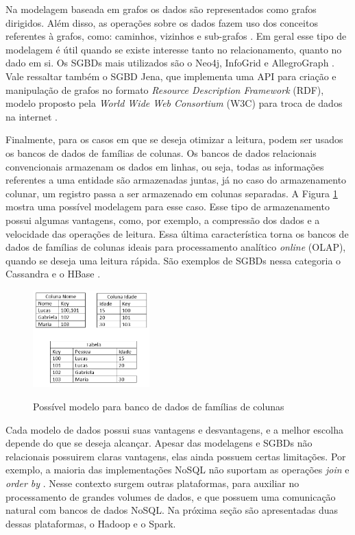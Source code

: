 Na modelagem baseada em grafos os dados são representados como grafos dirigidos. Além disso, 
as operações sobre os dados fazem uso dos conceitos referentes à grafos, como: caminhos, 
vizinhos e sub-grafos \cite{de2010nosql}. Em geral esse tipo de modelagem é útil 
quando se existe interesse tanto no relacionamento, quanto no dado em si. Os SGBDs mais 
utilizados são o Neo4j, InfoGrid e AllegroGraph \cite{moniruzzaman2013nosql}. Vale ressaltar 
também o SGBD Jena, que implementa uma API para criação e manipulação de grafos no formato 
\textit{Resource Description Framework} (RDF), modelo proposto pela \textit{World Wide Web 
Consortium} (W3C) para troca de dados na internet \cite{mcbride2001jena}.

Finalmente, para os casos em que se deseja otimizar a leitura, podem ser usados os bancos de 
dados de famílias de colunas. Os bancos de dados relacionais convencionais armazenam os dados 
em linhas, ou seja, todas as informações referentes a uma entidade são armazenadas juntas, 
já no caso do armazenamento colunar, um registro passa a ser armazenado em colunas separadas. 
A Figura \ref{fig:db-colunar} mostra uma possível modelagem para esse caso. Esse tipo de 
armazenamento possui algumas vantagens, como, por exemplo, a compressão dos dados e a 
velocidade das operações de leitura. Essa última característica torna os bancos de dados de 
famílias de colunas ideais para processamento analítico \textit{online} (OLAP), quando se 
deseja uma leitura rápida. São exemplos de SGBDs nessa categoria o Cassandra e o 
HBase \cite{de2010nosql}.

\begin{figure}[!htb]
    \centering
    \caption{Possível modelo para banco de dados de famílias de colunas}
    \includegraphics[width=0.4\textwidth]{./04-figuras/db-colunar}
    \label{fig:db-colunar}
\end{figure}


Cada modelo de dados possui suas vantagens e desvantagens, e a melhor escolha depende do que 
se deseja alcançar. Apesar das modelagens e SGBDs não relacionais possuirem claras vantagens,  
elas ainda possuem certas limitações. Por exemplo, a maioria das implementações NoSQL não
suportam as operações \textit{join} e \textit{order by} \cite{pokorny2013nosql}. 
Nesse contexto surgem outras plataformas, para auxiliar no processamento de grandes volumes 
de dados, e que possuem uma comunicação natural com bancos de dados NoSQL. Na próxima seção 
são apresentadas duas dessas plataformas, o Hadoop e o Spark.

